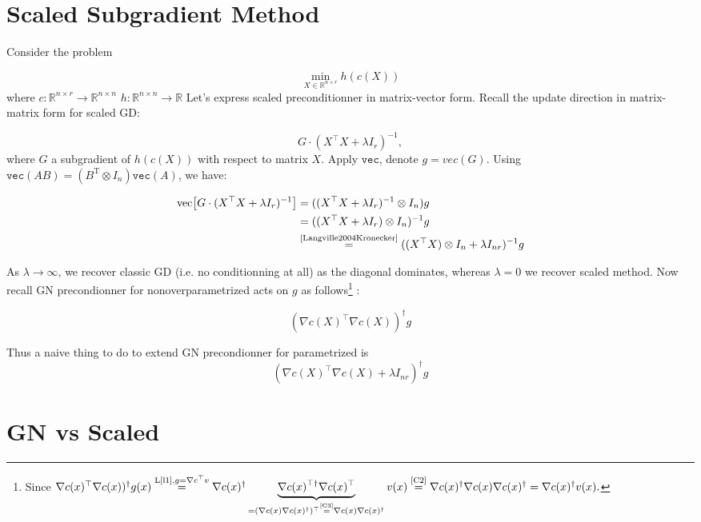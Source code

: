 \documentclass{article}
\begin{document}
\section{Scaled Subgradient Method}

Consider the problem

$$
\min_{X \in \mathbb{R}^{n\times r}} h(c(X))
$$
where $c:\mathbb{R}^{n\times r} \to \mathbb{R}^{n\times n} $ $h:\mathbb{R}^{n\times n} \to \mathbb{R}$
Let's express scaled preconditionner in matrix-vector form. Recall the update direction in matrix-matrix form  for scaled GD:

$$
G \cdot (X^\top X + \lambda I_r)^{-1},
$$
where $G$ a subgradient of $h(c(X))$ with respect to matrix $X$.
Apply $\texttt{vec}$, denote $g=vec(G)$. Using $\texttt{vec}(AB) = (B^{\mathrm{T}} \otimes I_{n})\texttt{vec}(A)$, we have:

\begin{align*}
\text{vec} \big[ G \cdot (X^\top X + \lambda I_r)^{-1} \big] &= ((X^\top X + \lambda I_r)^{-1}\otimes I_{n}) g \\
&= ((X^\top X + \lambda I_r) \otimes I_{n})^{-1} g \\
&\overset{\text{\cite{Langville2004Kronecker}}}{=} ((X^\top X ) \otimes I_n + \lambda I_{nr})^{-1} g
\end{align*}

As $\lambda \to \infty$,  we recover classic GD (i.e. no conditionning at all) as the diagonal dominates, whereas $\lambda = 0$ we recover scaled method. Now recall GN precondionner for nonoverparametrized acts on $g$ as follows\footnote{Since $\nabla c(x)^\top \nabla c(x))^{\dagger} g(x) \overset{\text{L\ref{l1},}g=\nabla c^\top v}{=} \nabla c(x)^\dagger \underbrace{\nabla c(x)^{\top \dagger } \nabla c(x)^\top}_{ = (\nabla c(x) \nabla c(x)^\dagger)^\top \overset{\text{\ref{C3}}}{=} \nabla c(x) \nabla c(x)^\dagger  } v(x)  \overset{\text{\ref{C2}}}{=} \nabla c(x)^\dagger \nabla c(x) \nabla c(x)^\dagger = \nabla c(x)^\dagger v(x).
$} :

$$
(\nabla c(X)^\top \nabla c(X))^{\dagger} g
$$

Thus a naive thing to do to extend GN precondionner for parametrized is 
$$
(\nabla c(X)^\top \nabla c(X) + \lambda I_{nr})^{\dagger} g
$$



\section{GN vs Scaled}
\end{document}
